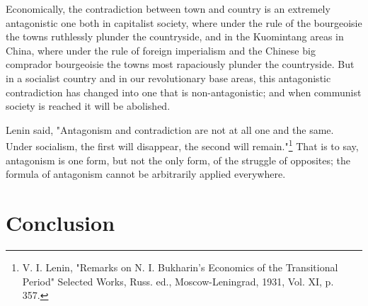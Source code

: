 \documentclass{article}
\begin{document}
Economically, the contradiction between town and country is an extremely
antagonistic one both in capitalist society, where under the rule of the
bourgeoisie the towns ruthlessly plunder the countryside, and in the Kuomintang
areas in China, where under the rule of foreign imperialism and the Chinese big
comprador bourgeoisie the towns most rapaciously plunder the countryside. But
in a socialist country and in our revolutionary base areas, this antagonistic
contradiction has changed into one that is non-antagonistic; and when communist
society is reached it will be abolished.

Lenin said, "Antagonism and contradiction are not at all one and the same.
Under socialism, the first will disappear, the second will remain."\footnote{V.
I. Lenin, "Remarks on N. I. Bukharin's Economics of the Transitional Period"
Selected Works, Russ. ed., Moscow-Leningrad, 1931, Vol. XI, p. 357.} That is to
say, antagonism is one form, but not the only form, of the struggle of
opposites; the formula of antagonism cannot be arbitrarily applied everywhere.

\section{Conclusion}
\end{document}
